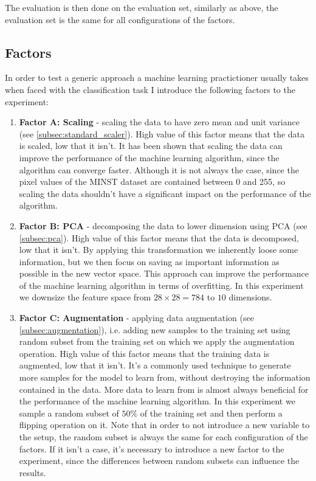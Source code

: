 \documentclass{article}
\begin{document}
The evaluation is then done on the evaluation set, similarly as above, the evaluation set is the same for all configurations of the factors.

\subsection{Factors}
In order to test a generic approach a machine learning practictioner usually takes when faced with the classification task I introduce the following factors to the experiment:
\begin{enumerate}
    \item \textbf{Factor A: Scaling} - scaling the data to have zero mean and unit variance (see \ref{subsec:standard_scaler}). High value of this factor means that the data is scaled, low that it isn't. It has been shown that scaling the data can improve the performance of the machine learning algorithm, since the algorithm can converge faster. Although it is not always the case, since the pixel values of the MINST dataset are contained between 0 and 255, so scaling the data shouldn't have a significant impact on the performance of the algorithm.
    \item \textbf{Factor B: PCA} - decomposing the data to lower dimension using PCA (see \ref{subsec:pca}). High value of this factor means that the data is decomposed, low that it isn't. By applying this transformation we inherently loose some information, but we then focus on saving as important information as possible in the new vector space. This approach can improve the performance of the machine learning algorithm in terms of overfitting. In this experiment we downsize the feature space from $28\times28=784$ to $10$ dimensions.
    \item \textbf{Factor C: Augmentation} - applying data augmentation (see \ref{subsec:augmentation}), i.e. adding new samples to the training set using random subset from the training set on which we apply the augmentation operation. High value of this factor means that the training data is augmented, low that it isn't. It's a commonly used technique to generate more samples for the model to learn from, without destroying the information contained in the data. More data to learn from is almost always beneficial for the performance of the machine learning algorithm. In this experiment we sample a random subset of $50\%$ of the training set and then perform a flipping operation on it. Note that in order to not introduce a new variable to the setup, the random subset is always the same for each configuration of the factors. If it isn't a case, it's necessary to introduce a new factor to the experiment, since the differences between random subsets can influence the results.

\end{enumerate}
\end{document}
